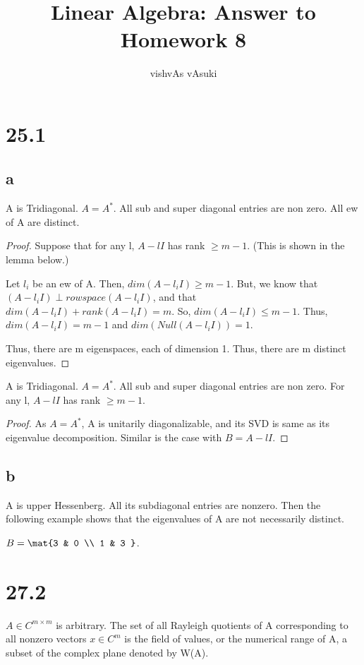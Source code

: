 \documentclass[10pt]{amsart}
\title{Linear Algebra: Answer to Homework 8}
\author{vishvAs vAsuki}
\begin{document}
\maketitle

\section{25.1}
\subsection{a}
\begin{thm}
A is Tridiagonal. $A=A^{*}$. All sub and super diagonal entries are non zero. All ew of A are distinct.
\end{thm}
\begin{proof}
Suppose that for any l, $A-lI$ has rank $\geq m-1$. (This is shown in the lemma below.)

Let $l_{i}$ be an ew of A. Then, $dim(A-l_{i}I) \geq m-1$. But, we know that $(A-l_{i}I) \perp rowspace(A-l_{i}I)$, and that $dim(A-l_{i}I) + rank(A-l_{i}I) = m$. So, $dim(A-l_{i}I) \leq m-1$. Thus, $dim(A-l_{i}I) = m-1$ and $dim(Null(A-l_{i}I)) = 1$.

Thus, there are m eigenspaces, each of dimension 1. Thus, there are m distinct eigenvalues.
\end{proof}

\begin{lem}
A is Tridiagonal. $A=A^{*}$. All sub and super diagonal entries are non zero. For any l, $A-lI$ has rank $\geq m-1$.
\end{lem}
\begin{proof}
As $A=A^{*}$, A is unitarily diagonalizable, and its SVD is same as its eigenvalue decomposition. Similar is the case with $B = A-lI$. \tbc
\end{proof}


\subsection{b}
A is upper Hessenberg. All its subdiagonal entries are nonzero. Then the following example shows that the eigenvalues of A are not necessarily distinct.

$B = \mat{3 & 0  \\  1 & 3 }$.

\section{27.2}
\begin{defn}
$A\in C^{m\times m}$ is arbitrary. The set of all Rayleigh quotients of A corresponding to all nonzero vectors $x\in C^{m}$ is the field of values, or the numerical range of A, a subset  of the complex plane denoted by W(A).
\end{defn}
\end{document}
